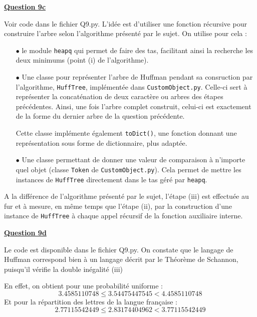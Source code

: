 \documentclass[a4paper,twoside,10pt]{article}
\newenvironment{Q}[1]{%
\vspace{1ex}
\underline{\textbf{Question #1\\}}
\newline
}{
\vspace{2ex}
}
\begin{document}
\begin{Q}{9c}
Voir code dans le fichier Q9.py.
L'idée est d'utiliser une fonction récursive pour construire l'arbre selon l'algorithme présenté par le sujet. On utilise pour cela :
\begin{itemize}

\item[$\bullet$]le module \texttt{heapq} qui permet de faire des tas, facilitant ainsi la recherche les deux minimums (point (i) de l'algorithme).

\item[$\bullet$] Une classe pour représenter l'arbre de Huffman pendant sa consruction par l'algorithme, \texttt{HuffTree}, implémentée dans \texttt{CustomObject.py}. Celle-ci sert à représenter la concaténation de deux caractère ou arbres des étapes précédentes. Ainsi, une fois l'arbre complet construit, celui-ci est exactement de la forme du dernier arbre de la question précédente.

Cette classe implémente également \texttt{toDict()}, une fonction donnant une représentation sous forme de dictionnaire, plus adaptée.

\item[$\bullet$] Une classe permettant de donner une valeur de comparaison à n'importe quel objet (classe \texttt{Token} de \texttt{CustomObject.py}). Cela permet de mettre les instances de \texttt{HuffTree} directement dans le tas géré par \texttt{heapq}.
\end{itemize}

A la différence de l'algorithme présenté par le sujet, l'étape (iii) est effectuée au fur et à mesure, en même temps que l'étape (ii), par la construction d'une instance de \texttt{HuffTree} à chaque appel récursif de la fonction auxiliaire interne.

\end{Q}

\begin{Q}{9d}
Le code est disponible dans le fichier Q9.py.
On constate que le langage de Huffman correspond bien à un langage décrit par le Théorème de Schannon, puisqu'il vérifie
la double inégalité (iii)

En effet, on obtient pour une probabilité uniforme : 
\[ 3.4585110748 \leq 3.54475447545 < 4.4585110748 \]
Et pour la répartition des lettres de la langue française : 
\[ 2.77115542449 \leq 2.83174404962 < 3.77115542449 \]
\end{Q}
\end{document}
